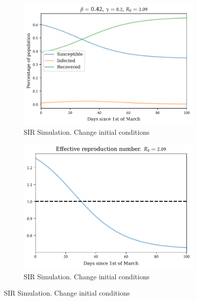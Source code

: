 \documentclass[a4paper,11pt]{article}
\theoremstyle{definition}
\theoremstyle{plain}
\begin{document}
\begin{figure}[htbp]
	
	\centering
	
	\begin{subfigure}[b]{0.48\textwidth}
		\centering
			\includegraphics[width = \textwidth]{sir_example_files/sir_example_11_0.pdf}
		\caption{SIR Simulation. Change initial conditions}
		\label{fig:sir_simul_S0}
	\end{subfigure}
	\begin{subfigure}[b]{0.48\textwidth}
		\centering
			\includegraphics[width = \textwidth]{sir_example_files/sir_example_13_0.pdf}
		\caption{SIR Simulation. Change initial conditions}
		\label{fig:effective_number_S0}
	\end{subfigure}
\end{figure}
    
\end{document}
